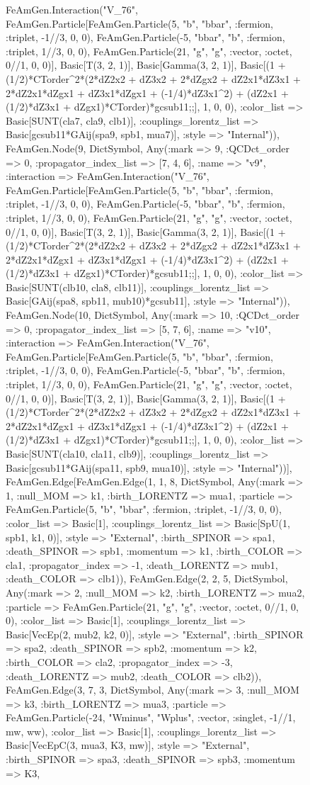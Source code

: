 \documentclass{revtex4}
\begin{document}
\begin{figure}[!htb]
\begin{center}
{FeAmGen.Interaction("V_76", FeAmGen.Particle[FeAmGen.Particle(5, "b", "bbar", :fermion, :triplet, -1//3, 0, 0), FeAmGen.Particle(-5, "bbar", "b", :fermion, :triplet, 1//3, 0, 0), FeAmGen.Particle(21, "g", "g", :vector, :octet, 0//1, 0, 0)], Basic[T(3, 2, 1)], Basic[Gamma(3, 2, 1)], Basic[(1 + (1/2)*CTorder^2*(2*dZ2x2 + dZ3x2 + 2*dZgx2 + dZ2x1*dZ3x1 + 2*dZ2x1*dZgx1 + dZ3x1*dZgx1 + (-1/4)*dZ3x1^2) + (dZ2x1 + (1/2)*dZ3x1 + dZgx1)*CTorder)*gcsub11;;], 1, 0, 0), :color_list => Basic[SUNT(cla7, cla9, clb1)], :couplings_lorentz_list => Basic[gcsub11*GAij(spa9, spb1, mua7)], :style => "Internal")), FeAmGen.Node(9, Dict{Symbol, Any}(:mark => 9, :QCDct_order => 0, :propagator_index_list => [7, 4, 6], :name => "v9", :interaction => FeAmGen.Interaction("V_76", FeAmGen.Particle[FeAmGen.Particle(5, "b", "bbar", :fermion, :triplet, -1//3, 0, 0), FeAmGen.Particle(-5, "bbar", "b", :fermion, :triplet, 1//3, 0, 0), FeAmGen.Particle(21, "g", "g", :vector, :octet, 0//1, 0, 0)], Basic[T(3, 2, 1)], Basic[Gamma(3, 2, 1)], Basic[(1 + (1/2)*CTorder^2*(2*dZ2x2 + dZ3x2 + 2*dZgx2 + dZ2x1*dZ3x1 + 2*dZ2x1*dZgx1 + dZ3x1*dZgx1 + (-1/4)*dZ3x1^2) + (dZ2x1 + (1/2)*dZ3x1 + dZgx1)*CTorder)*gcsub11;;], 1, 0, 0), :color_list => Basic[SUNT(clb10, cla8, clb11)], :couplings_lorentz_list => Basic[GAij(spa8, spb11, mub10)*gcsub11], :style => "Internal")), FeAmGen.Node(10, Dict{Symbol, Any}(:mark => 10, :QCDct_order => 0, :propagator_index_list => [5, 7, 6], :name => "v10", :interaction => FeAmGen.Interaction("V_76", FeAmGen.Particle[FeAmGen.Particle(5, "b", "bbar", :fermion, :triplet, -1//3, 0, 0), FeAmGen.Particle(-5, "bbar", "b", :fermion, :triplet, 1//3, 0, 0), FeAmGen.Particle(21, "g", "g", :vector, :octet, 0//1, 0, 0)], Basic[T(3, 2, 1)], Basic[Gamma(3, 2, 1)], Basic[(1 + (1/2)*CTorder^2*(2*dZ2x2 + dZ3x2 + 2*dZgx2 + dZ2x1*dZ3x1 + 2*dZ2x1*dZgx1 + dZ3x1*dZgx1 + (-1/4)*dZ3x1^2) + (dZ2x1 + (1/2)*dZ3x1 + dZgx1)*CTorder)*gcsub11;;], 1, 0, 0), :color_list => Basic[SUNT(cla10, cla11, clb9)], :couplings_lorentz_list => Basic[gcsub11*GAij(spa11, spb9, mua10)], :style => "Internal"))], FeAmGen.Edge[FeAmGen.Edge(1, 1, 8, Dict{Symbol, Any}(:mark => 1, :null_MOM => k1, :birth_LORENTZ => mua1, :particle => FeAmGen.Particle(5, "b", "bbar", :fermion, :triplet, -1//3, 0, 0), :color_list => Basic[1], :couplings_lorentz_list => Basic[SpU(1, spb1, k1, 0)], :style => "External", :birth_SPINOR => spa1, :death_SPINOR => spb1, :momentum => k1, :birth_COLOR => cla1, :propagator_index => -1, :death_LORENTZ => mub1, :death_COLOR => clb1)), FeAmGen.Edge(2, 2, 5, Dict{Symbol, Any}(:mark => 2, :null_MOM => k2, :birth_LORENTZ => mua2, :particle => FeAmGen.Particle(21, "g", "g", :vector, :octet, 0//1, 0, 0), :color_list => Basic[1], :couplings_lorentz_list => Basic[VecEp(2, mub2, k2, 0)], :style => "External", :birth_SPINOR => spa2, :death_SPINOR => spb2, :momentum => k2, :birth_COLOR => cla2, :propagator_index => -3, :death_LORENTZ => mub2, :death_COLOR => clb2)), FeAmGen.Edge(3, 7, 3, Dict{Symbol, Any}(:mark => 3, :null_MOM => k3, :birth_LORENTZ => mua3, :particle => FeAmGen.Particle(-24, "Wminus", "Wplus", :vector, :singlet, -1//1, mw, ww), :color_list => Basic[1], :couplings_lorentz_list => Basic[VecEpC(3, mua3, K3, mw)], :style => "External", :birth_SPINOR => spa3, :death_SPINOR => spb3, :momentum => K3, }
\end{center}
\end{figure}
\end{document}
